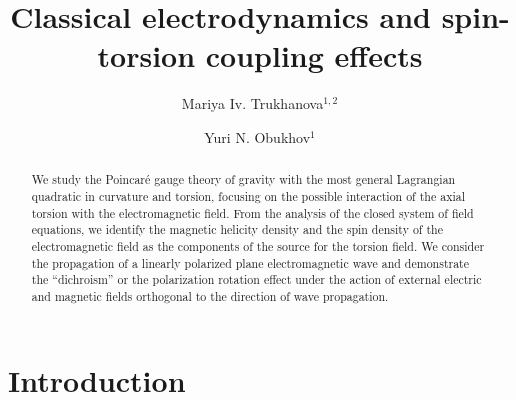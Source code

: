 \documentclass[12pt,prd,showkeys,amsmath,amssymb,nofootinbib]{revtex4-1}
\begin{document}
\title{Classical electrodynamics and spin-torsion coupling effects}

\author{Mariya Iv. Trukhanova$^{1,2}$}
\author{Yuri N. Obukhov$^{1}$}

\begin{abstract}
We study the Poincar\'e gauge theory of gravity with the most general Lagrangian quadratic in curvature and torsion, focusing on the possible interaction of the axial torsion with the electromagnetic field. From the analysis of the closed system of field equations, we identify the magnetic helicity density and the spin density of the electromagnetic field as the components of the source for the torsion field. We consider the propagation of a linearly polarized plane electromagnetic wave and demonstrate the ``dichroism'' or the polarization rotation effect under the action of external electric and magnetic fields orthogonal to the direction of wave propagation.
\end{abstract}


\maketitle

\section{Introduction}
\end{document}
